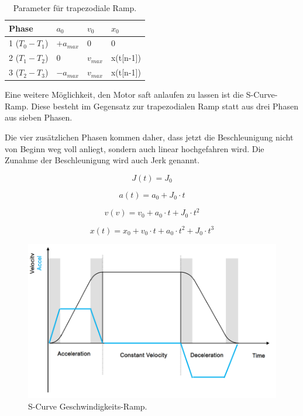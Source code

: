 \begin{table}[H]
\center
\begin{tabular}{|l|l|l|l|}
\hline
Phase 				& $a_0$ 			& $v_0$ 			& $x_0$ 		\\
\hline
1 ($T_0 - T_1$)		& $+a_{max}$		& 0				& 0			\\
\hline
2 ($T_1 - T_2$)		& 0				& $v_{max}$		& x(t[n-1])	\\
\hline
3 ($T_2 - T_3$)		& $-a_{max}$		& $v_{max}$		& x(t[n-1])	\\
\hline
\end{tabular}
\caption{Parameter für trapezodiale Ramp.}
\end{table}

Eine weitere Möglichkeit, den Motor saft anlaufen zu lassen ist die S-Curve-Ramp. Diese besteht im Gegensatz zur trapezodialen Ramp statt aus drei Phasen aus sieben Phasen.

Die vier zusätzlichen Phasen kommen daher, dass jetzt die Beschleunigung nicht von Beginn weg voll anliegt, sondern auch linear hochgefahren wird. Die Zunahme der Beschleunigung wird auch Jerk genannt. \cite{collins_how_2017}

\begin{equation}
J(t) = J_0
\end{equation}

\begin{equation}
a(t) = a_0 + J_0 \cdot t
\label{equ:Beschleunigung_2}
\end{equation}

\begin{equation}
v(v) = v_0 + a_0 \cdot t + J_0 \cdot t^2
\label{equ:Geschwindigkeit_2}
\end{equation}

\begin{equation}
x(t) = x_0 + v_0 \cdot t + a_0 \cdot t ^ 2 + J_0 \cdot t^3
\label{equ:Position_2}
\end{equation}

\begin{figure}[H]
\center
\includegraphics[width = 0.8 \textwidth]{graphics/S_Curved_Ramp}
\caption{S-Curve Geschwindigkeits-Ramp.\cite{abb_application_2012}}
\label{fig:S_Curved_Ramp_2}
\end{figure}

